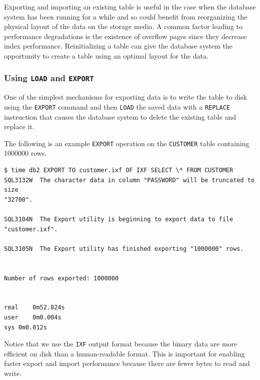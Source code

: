\documentclass[letterpaper]{article}%
\begin{document}
Exporting and importing an existing table is useful in the case when the
database system has been running for a while and so could benefit from
reorganizing the physical layout of the data on the storage media. A common
factor leading to performance degradations is the existence of overflow pages
since they decrease index performance. Reinitializing a table can give the
database system the opportunity to create a table using an optimal layout for
the data.

\subsubsection{Using \texttt{LOAD} and \texttt{EXPORT}}

One of the simplest mechanisms for exporting data is to write the table to disk
using the \texttt{EXPORT} command and then \texttt{LOAD} the saved data with a
\texttt{REPLACE} instruction that causes the database system to delete the
existing table and replace it.

The following is an example \texttt{EXPORT} operation on the \texttt{CUSTOMER}
table containing 1000000 rows.
\begin{Verbatim}[frame=single]
$ time db2 EXPORT TO customer.ixf OF IXF SELECT \* FROM CUSTOMER
SQL3132W  The character data in column "PASSWORD" will be truncated to size
"32700".

SQL3104N  The Export utility is beginning to export data to file
"customer.ixf".

SQL3105N  The Export utility has finished exporting "1000000" rows.


Number of rows exported: 1000000


real    0m52.824s
user    0m0.004s
sys 0m0.012s
\end{Verbatim}
Notice that we use the \texttt{IXF} output format because the binary data are
more efficient on disk than a human-readable format. This is important for
enabling faster export and import performance because there are fewer bytes to
read and write.
\end{document}
